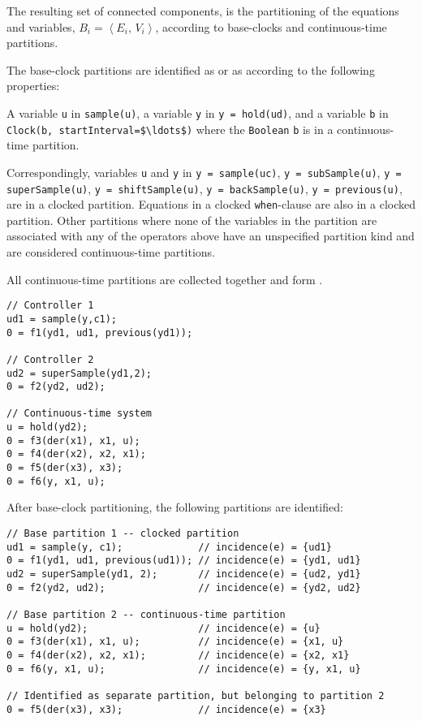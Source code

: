The resulting set of connected components, is the partitioning of the equations and variables, $B_{i} = \left\langle E_{i},\, V_{i} \right\rangle$, according to base-clocks and continuous-time partitions.

The base-clock partitions are identified as  or as  according to the following properties:

A variable \lstinline!u! in \lstinline!sample(u)!, a variable \lstinline!y! in \lstinline!y = hold(ud)!, and a variable \lstinline!b! in \lstinline!Clock(b, startInterval=$\ldots$)! where the \lstinline!Boolean! \lstinline!b! is in a continuous-time partition.

Correspondingly, variables \lstinline!u! and \lstinline!y! in
\lstinline!y = sample(uc)!,
\lstinline!y = subSample(u)!,
\lstinline!y = superSample(u)!,
\lstinline!y = shiftSample(u)!,
\lstinline!y = backSample(u)!,
\lstinline!y = previous(u)!,
are in a clocked partition.
Equations in a clocked \lstinline!when!-clause are also in a clocked partition.
Other partitions where none of the variables in the partition are associated with any of the operators above have an unspecified partition kind and are considered continuous-time partitions.

All continuous-time partitions are collected together and form .

\begin{example}
\begin{lstlisting}[language=modelica]
// Controller 1
ud1 = sample(y,c1);
0 = f1(yd1, ud1, previous(yd1));

// Controller 2
ud2 = superSample(yd1,2);
0 = f2(yd2, ud2);

// Continuous-time system
u = hold(yd2);
0 = f3(der(x1), x1, u);
0 = f4(der(x2), x2, x1);
0 = f5(der(x3), x3);
0 = f6(y, x1, u);
\end{lstlisting}

After base-clock partitioning, the following partitions are identified:
\begin{lstlisting}[language=modelica]
// Base partition 1 -- clocked partition
ud1 = sample(y, c1);             // incidence(e) = {ud1}
0 = f1(yd1, ud1, previous(ud1)); // incidence(e) = {yd1, ud1}
ud2 = superSample(yd1, 2);       // incidence(e) = {ud2, yd1}
0 = f2(yd2, ud2);                // incidence(e) = {yd2, ud2}

// Base partition 2 -- continuous-time partition
u = hold(yd2);                   // incidence(e) = {u}
0 = f3(der(x1), x1, u);          // incidence(e) = {x1, u}
0 = f4(der(x2), x2, x1);         // incidence(e) = {x2, x1}
0 = f6(y, x1, u);                // incidence(e) = {y, x1, u}

// Identified as separate partition, but belonging to partition 2
0 = f5(der(x3), x3);             // incidence(e) = {x3}
\end{lstlisting}
\end{example}


